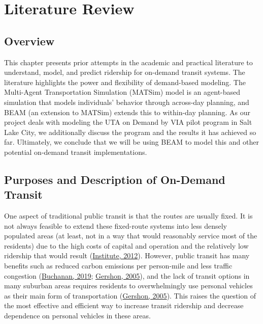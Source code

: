 \documentclass[
]{report}
\begin{document}
\hypertarget{literature-review}{%
\chapter{Literature Review}\label{literature-review}}

\hypertarget{overview}{%
\section{Overview}\label{overview}}

This chapter presents prior attempts in the academic and practical literature to understand, model, and predict ridership for on-demand transit systems. The literature highlights the power and flexibility of demand-based modeling. The Multi-Agent Transportation Simulation (MATSim) model is an agent-based simulation that models individuals' behavior through across-day planning, and BEAM (an extension to MATSim) extends this to within-day planning. As our project deals with modeling the UTA on Demand by VIA pilot program in Salt Lake City, we additionally discuss the program and the results it has achieved so far. Ultimately, we conclude that we will be using BEAM to model this and other potential on-demand transit implementations.

\hypertarget{purposes-and-description-of-on-demand-transit}{%
\section{Purposes and Description of On-Demand Transit}\label{purposes-and-description-of-on-demand-transit}}

One aspect of traditional public transit is that the routes are usually fixed. It is not always feasible to extend these fixed-route systems into less densely populated areas (at least, not in a way that would reasonably service most of the residents) due to the high costs of capital and operation and the relatively low ridership that would result (\protect\hyperlink{ref-MinetaTransportationInstitute2012}{Institute, 2012}). However, public transit has many benefits such as reduced carbon emissions per person-mile and less traffic congestion (\protect\hyperlink{ref-Buchanan2019}{Buchanan, 2019}; \protect\hyperlink{ref-Gershon2005}{Gershon, 2005}), and the lack of transit options in many suburban areas requires residents to overwhelmingly use personal vehicles as their main form of transportation (\protect\hyperlink{ref-Gershon2005}{Gershon, 2005}). This raises the question of the most effective and efficient way to increase transit ridership and decrease dependence on personal vehicles in these areas.
\end{document}
